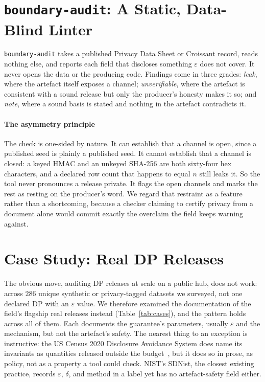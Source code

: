 \documentclass[conference]{IEEEtran}
\newcommand{\eps}{\varepsilon}
\newcommand{\code}[1]{\texttt{\small #1}}
\begin{document}
\section{\code{boundary-audit}: A Static, Data-Blind Linter}
\code{boundary-audit} takes a published Privacy Data Sheet or Croissant record, reads nothing else, and
reports each field that discloses something $\eps$ does not cover. It never opens the data or the
producing code. Findings come in three grades: \emph{leak}, where the artefact itself exposes a
channel; \emph{unverifiable}, where the artefact is consistent with a sound release but only the
producer's honesty makes it so; and \emph{note}, where a sound basis is stated and nothing in the
artefact contradicts it.

\paragraph{The asymmetry principle} The check is one-sided by nature. It can establish that a channel
is open, since a published seed is plainly a published seed. It cannot establish that a channel is
closed: a keyed HMAC and an unkeyed SHA-256 are both sixty-four hex characters, and a declared row
count that happens to equal $n$ still leaks it. So the tool never pronounces a release private. It
flags the open channels and marks the rest as resting on the producer's word. We regard that restraint
as a feature rather than a shortcoming, because a checker claiming to certify privacy from a document
alone would commit exactly the overclaim the field keeps warning against.

\section{Case Study: Real DP Releases}\label{sec:cases}
The obvious move, auditing DP releases at scale on a public hub, does not work: across $286$ unique
synthetic or privacy-tagged datasets we surveyed, not one declared DP with an $\eps$ value. We
therefore examined the documentation of the field's flagship real releases instead
(Table~\ref{tab:cases}), and the pattern holds across all of them. Each documents the guarantee's
parameters, usually $\eps$ and the mechanism, but not the artefact's safety. The nearest thing to an
exception is instructive: the US Census 2020 Disclosure Avoidance System does name its invariants as
quantities released outside the budget~\cite{abowd2022}, but it does so in prose, as policy, not as a
property a tool could check. NIST's SDNist, the closest existing practice, records $\eps$, $\delta$,
and method in a label yet has no artefact-safety field either.
\end{document}
